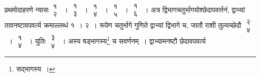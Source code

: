 \documentclass[10pt, openany]{book}
\begin{document}
{प्रथमोदाहरणे न्यासः\textendash \,$\begin{matrix}

\mbox{{१}}\\

\mbox{{२}}

\end{matrix}$~। $\begin{matrix}

\mbox{{१}}\\

\mbox{{३}}

\end{matrix}$~। $\begin{matrix}

\mbox{{१}}\\

\mbox{{४}}

\end{matrix}$~। $\begin{matrix}

\mbox{{१}}\\

\mbox{{५}}

\end{matrix}$~। $\begin{matrix}

\mbox{{१}}\\

\mbox{{६}}

\end{matrix}$~। अत्र द्विभागचतुर्भागयोश्छेदापवर्त्तनं, द्वाभ्यां तावनष्टावपवर्त्य क्रमाल्लब्धं १~। २~। रूपेण चतुर्भागे गुणिते
द्वाभ्यां द्विभागे च, जातौ}
{राशी तुल्यच्छेदौ $\begin{matrix}

\mbox{{२}}\\

\mbox{{४}}

\end{matrix}$~। $\begin{matrix}

\mbox{{१}}\\

\mbox{{४}}

\end{matrix}$~। युतिः $\begin{matrix}

\mbox{{३}}\\

\mbox{{४}}

\end{matrix}$~। अस्य
षड्भागस्य\renewcommand{\thefootnote}{\s ५}\footnote{\s सद्भागस्य~।} च सवर्णनम्~। द्वाभ्यामनष्टौ छेदावपवर्त्य}
\end{document}
